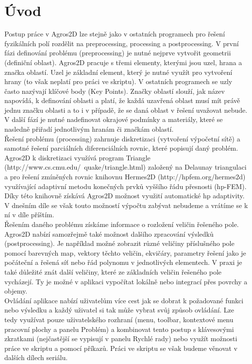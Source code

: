 \documentclass[a4paper, oneside]{article}
\begin{document}
\section{Úvod}
Postup práce v Agros2D lze stejně jako v ostatních programech pro řešení fyzikálních polí rozdělit na preprocessing, processing a postprocessing. V první fázi definování problému (preprocessing) je nutné nejprve vytvořit geometrii (definiční oblast). Agros2D pracuje s třemi elementy, kterými jsou uzel, hrana a značka oblastí. Uzel je základní element, který je nutné využít pro vytvoření hrany (to však neplatí pro práci ve skriptu). V ostatních programech se uzly často nazývají klíčové body (Key Points). Značky oblastí slouží, jak název napovídá, k definování oblasti a platí, že každá uzavřená oblast musí mít právě jednu značku oblasti a to i v případě, že se daná oblast v řešení uvažovat nebude. V další fází je nutné nadefinovat okrajové podmínky a materiály, které se nasledně přiřadí jednotlivým hranám či značkám oblastí.\\
Řešení problému (processing) zahrnuje diskretizaci (vytvoření výpočetní sítě) a samotné řešení parciálních diferenciálních rovnic, které popisují daný problém. Agros2D k diskretizaci využívá program Triangle (http://www.cs.cmu.edu/~quake/triangle.html) založený na Delaunay triangulaci a pro řešení zmíněných rovnic knihovnu Hermes2D (http://hpfem.org/hermes2d) využívající adaptivní metodu konečných prvků vyššího řádu přesnosti (hp-FEM). Díky této knihovně získává Agros2D možnost využití automatické hp adaptivity. V dnešním díle se však touto možností výpočtu zabývat nebudeme a vrátíme se k ní v díle příštím.\\
Řešením daného problému získáme informace o rozložení veličin řešeného pole. Agros2D nabízí samozřejmě také možnost dalšího zpracování výsledků (postprocessing). Je například možné zobrazit různé veličiny příslušného pole pomocí barevných map, vektory těchto veličin, ekvičáry, parametry řešení jako je počáteční a řešená síť nebo řád polynomu v jednotlivých elementech. V praxi je také důležité znát další veličiny, které ze základních veličin řešeného pole vycházejí. Ty je možné v aplikaci vypočítat lokálně nebo integrací přes povrchy a objemy.\\
Ovládání aplikace nabízí uživatelům více cest jak se dobrat k požadované funkci nebo výsledku a každý uživatel si tak může vybrat svůj způsob ovládání. Lze tedy využívat pouze uživatelského rozhraní (menu, toolbar, kontextové menu pracovní plochy a panelu Problém) a kombinovat tento postup s klávesovými zkratkami (nejčastější se vypisují v panelu Rychlé rady) nebo využít možnosti práce ve skriptu a pomocí příkazů. Práci ve skriptu se však budeme věnovat v dalších dílech seriálu.\\
\end{document}
